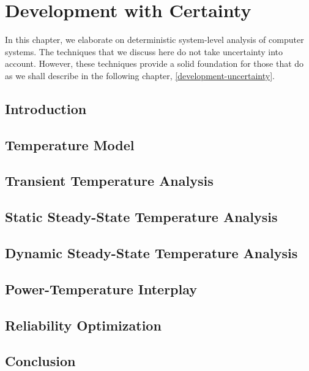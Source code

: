 \chapter{Development with Certainty}
\newcommand{\inputsection}[1]{}

In this chapter, we elaborate on deterministic system-level analysis of computer
systems. The techniques that we discuss here do not take uncertainty into
account. However, these techniques provide a solid foundation for those that do
as we shall describe in the following chapter, \cref{development-uncertainty}.

\section{Introduction}
\inputsection{introduction}

\section{Temperature Model}
\inputsection{temperature-model}

\section{Transient Temperature Analysis}
\inputsection{transient-analysis}

\section{Static Steady-State Temperature Analysis}
\inputsection{static-steady-state-analysis}

\section{Dynamic Steady-State Temperature Analysis}
\inputsection{dynamic-steady-state-analysis}

\section{Power-Temperature Interplay}
\inputsection{power-temperature-interplay}

\section{Reliability Optimization}
\inputsection{reliability-optimization}

\section{Conclusion}
\inputsection{conclusion}
